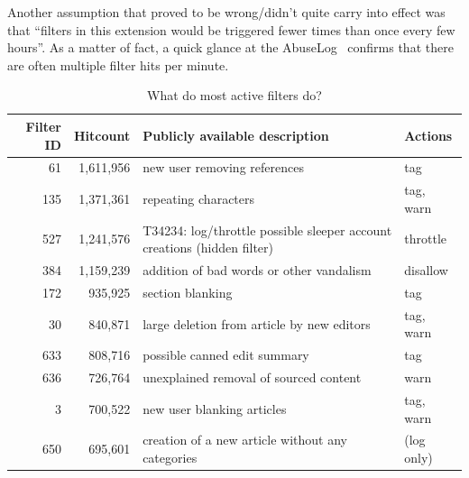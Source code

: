 Another assumption that proved to be wrong/didn't quite carry into effect was that ``filters in this extension would be triggered fewer times than once every few hours''.
As a matter of fact, a quick glance at the AbuseLog~\cite{Wikipedia:AbuseLog} confirms that there are often multiple filter hits per minute.

\begin{table}
  \centering
    \begin{tabular}{r r p{8cm} p{2cm} }
        Filter ID & Hitcount & Publicly available description & Actions \\
    \hline
       61 & 1,611,956 & new user removing references & tag \\
      135 & 1,371,361 & repeating characters & tag, warn \\
      527 & 1,241,576 & T34234: log/throttle possible sleeper account creations (hidden filter) & throttle \\
      384 & 1,159,239 & addition of bad words or other vandalism & disallow \\
      172 & 935,925 & section blanking & tag \\
       30 & 840,871 & large deletion from article by new editors & tag, warn \\
      633 & 808,716 & possible canned edit summary & tag \\
      636 & 726,764 & unexplained removal of sourced content & warn \\
        3 & 700,522 & new user blanking articles & tag, warn \\
      650 & 695,601 & creation of a new article without any categories & (log only) \\
  \end{tabular}
  \caption{What do most active filters do?}~\label{tab:most-active-actions}
\end{table}


